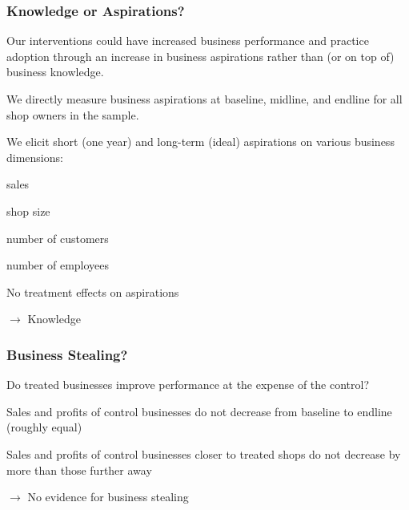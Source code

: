 \documentclass[hideothersubsections, usenames,dvipsnames,10pt]{beamer}
\newenvironment{itemize_3pt}{\itemize\addtolength{\itemsep}{3pt}}{\enditemize}
\begin{document}
\begin{frame}
\frametitle{Knowledge or Aspirations?}
\begin{itemize_3pt}
\item Our interventions could have increased business performance and practice adoption through an increase in business aspirations rather than (or on top of) business knowledge.
\vspace{0.1in}
\item We directly measure business aspirations at baseline, midline, and endline for all shop owners in the sample.
\vspace{0.1in}
\item We elicit short (one year) and long-term (ideal) aspirations on various business dimensions:
\vspace{0.1in}
    \begin{itemize_3pt}
    \item sales
    \item shop size
    \item number of customers
    \item number of employees
    \end{itemize_3pt}
\vspace{0.1in}
\item No treatment effects on aspirations
\vspace{0.1in}
\end{itemize_3pt}
$\rightarrow$ \textcolor{bdf}{Knowledge}
\end{frame}

\begin{frame}
\frametitle{Business Stealing?}
Do treated businesses improve performance at the expense of the control?
\vspace{0.1in}
\begin{itemize_3pt}
\item Sales and profits of \textcolor{bdf}{control businesses do not decrease} from baseline to endline (roughly equal)
\item Sales and profits of control businesses \textcolor{bdf}{closer to treated shops do not decrease by more} than those further away
\item[] $\rightarrow$ \textcolor{bdf}{No evidence for business stealing}
\end{itemize_3pt}
\end{frame}
\end{document}
